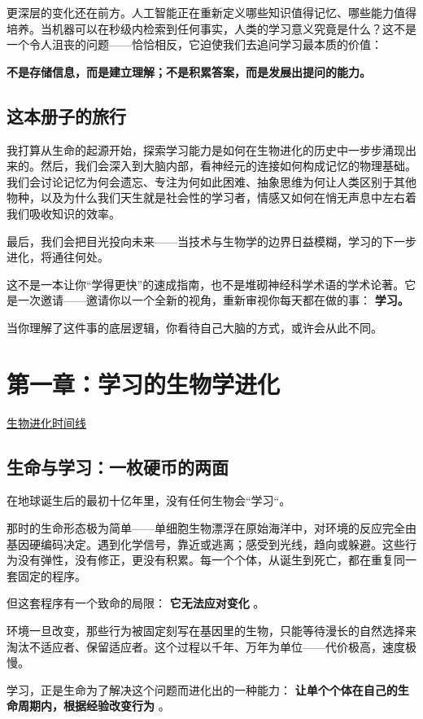 \documentclass[11pt]{article}
\begin{document}
更深层的变化还在前方。人工智能正在重新定义哪些知识值得记忆、哪些能力值得培养。当机器可以在秒级内检索到任何事实，人类的学习意义究竟是什么？这不是一个令人沮丧的问题——恰恰相反，它迫使我们去追问学习最本质的价值：

\textbf{不是存储信息，而是建立理解；不是积累答案，而是发展出提问的能力。}
\subsection{这本册子的旅行}
\label{sec:orgef336c3}

我打算从生命的起源开始，探索学习能力是如何在生物进化的历史中一步步涌现出来的。然后，我们会深入到大脑内部，看神经元的连接如何构成记忆的物理基础。我们会讨论记忆为何会遗忘、专注为何如此困难、抽象思维为何让人类区别于其他物种，以及为什么我们天生就是社会性的学习者，情感又如何在悄无声息中左右着我们吸收知识的效率。

最后，我们会把目光投向未来——当技术与生物学的边界日益模糊，学习的下一步进化，将通往何处。

这不是一本让你“学得更快”的速成指南，也不是堆砌神经科学术语的学术论著。它是一次邀请——邀请你以一个全新的视角，重新审视你每天都在做的事： \textbf{学习。}

当你理解了这件事的底层逻辑，你看待自己大脑的方式，或许会从此不同。
\section{第一章：学习的生物学进化}
\label{sec:org952ab43}

\href{file:///c:/Users/fupen/org/book/插图/生物进化时间线：从单细胞到人类大脑的演变历程.png}{生物进化时间线}
\subsection{生命与学习：一枚硬币的两面}
\label{sec:orgad9397b}

在地球诞生后的最初十亿年里，没有任何生物会“学习“。

那时的生命形态极为简单——单细胞生物漂浮在原始海洋中，对环境的反应完全由基因硬编码决定。遇到化学信号，靠近或逃离；感受到光线，趋向或躲避。这些行为没有弹性，没有修正，更没有积累。每一个个体，从诞生到死亡，都在重复同一套固定的程序。

但这套程序有一个致命的局限： \textbf{它无法应对变化} 。

环境一旦改变，那些行为被固定刻写在基因里的生物，只能等待漫长的自然选择来淘汰不适应者、保留适应者。这个过程以千年、万年为单位——代价极高，速度极慢。

学习，正是生命为了解决这个问题而进化出的一种能力： \textbf{让单个个体在自己的生命周期内，根据经验改变行为} 。
\end{document}

